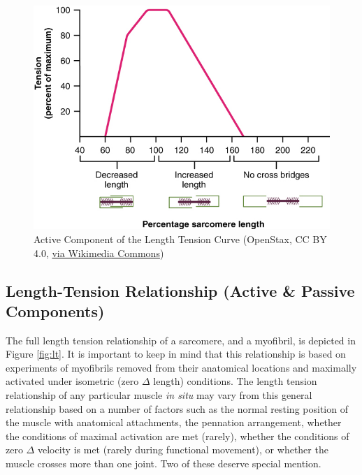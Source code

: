 \begin{figure}[!ht]
    \centering
    \includegraphics[width=1\linewidth]{./figure/active_lt.jpg}
    \caption{Active Component of the Length Tension Curve \footnotesize{(OpenStax, CC BY 4.0, \href{https://creativecommons.org/licenses/by/4.0}{via Wikimedia Commons})}}
    \label{fig:active_lt}
\end{figure}


\subsection{Length-Tension Relationship (Active \& Passive Components)}

The full length tension relationship of a sarcomere, and a myofibril, is depicted in Figure \ref{fig:lt}. It is important to keep in mind that this relationship is based on experiments of myofibrils removed from their anatomical locations and maximally activated under isometric (zero $\Delta$ length) conditions. The length tension relationship of any particular muscle \textit{in situ} may vary from this general relationship based on a number of factors such as the normal resting position of the muscle with anatomical attachments, the pennation arrangement, whether the conditions of maximal activation are met (rarely), whether the conditions of zero $\Delta$ velocity is met (rarely during functional movement), or whether the muscle crosses more than one joint. Two of these deserve special mention. 

